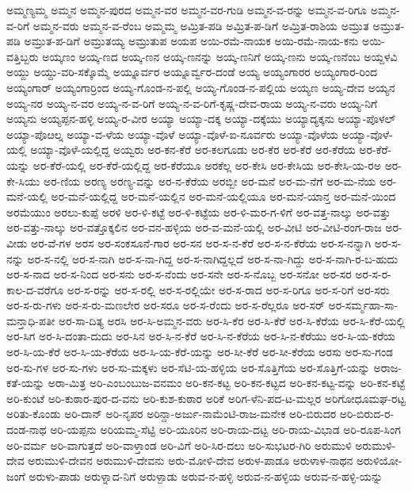 ಅಮ್ಮಣ್ಯಮ್ಮ
ಅಮ್ಮನ
ಅಮ್ಮನ-ಪುರದ
ಅಮ್ಮನ-ವರ
ಅಮ್ಮನ-ವರ-ಗುಡಿ
ಅಮ್ಮನ-ವ-ರನ್ನು
ಅಮ್ಮನ-ವ-ರಿಗೂ
ಅಮ್ಮನ-ವ-ರಿಗೆ
ಅಮ್ಮನ-ವರು
ಅಮ್ಮನ-ವ-ರೆಂಬ
ಅಮ್ಮಮ್ಮ
ಅಮ್ರಿತ-ಪಡಿ
ಅಮ್ರಿತ-ಪ-ಡಿಗೆ
ಅಮ್ರಿತ-ರಾಶಿಯ
ಅಮ್ರುತ
ಅಮ್ರುತ-ಪಡಿ
ಅಮ್ರುತ-ಪ-ಡಿಗೆ
ಅಮ್ರುತಯ್ಯ
ಅಮ್ರುತುಪ
ಅಯಪ
ಅಯಿ-ರಮೆ-ನಾಯಕ
ಅಯಿ-ರಮೆ-ನಾಯ-ಕನು
ಅಯಿ-ವತ್ತಿಬ್ಬರು
ಅಯ್ಕಣಂ
ಅಯ್ಕ-ಣದ
ಅಯ್ಕ-ಣನ
ಅಯ್ಕ-ಣನನ್ನು
ಅಯ್ಕ-ಣನಿಗೆ
ಅಯ್ಕ-ಣನು
ಅಯ್ಕ-ಣನೆಂಬ
ಅಯ್ದಳವಿ
ಅಯ್ದು
ಅಯ್ದು-ವರಿ-ಸಕ್ಕೊಮ್ಮೆ
ಅಯ್ನೂರ್ವರ
ಅಯ್ನೂರ್ವ್ವರ-ದಂಡೆ
ಅಯ್ಯ
ಅಯ್ಯಂಗಾರರ
ಅಯ್ಯಂಗಾರ-ರಿಂದ
ಅಯ್ಯಂಗಾರ್
ಅಯ್ಯಂಗಾರ್ರಿಂದ
ಅಯ್ಯ-ಗೊಂಡ-ನ-ಪಲ್ಲಿ
ಅಯ್ಯ-ಗೊಂಡ-ನ-ಪಲ್ಲಿಯ
ಅಯ್ಯಣ
ಅಯ್ಯ-ದೇವ
ಅಯ್ಯನ
ಅಯ್ಯ-ನರ
ಅಯ್ಯ-ನ-ವರ
ಅಯ್ಯ-ನ-ವ-ರಿಗೆ
ಅಯ್ಯ-ನ-ವ-ರಿಗೆ-ಕೃಷ್ಣ-ದೇವ-ರಾಯ
ಅಯ್ಯ-ನ-ವರು
ಅಯ್ಯ-ನಿಗೆ
ಅಯ್ಯನು
ಅಯ್ಯಪ್ಪನ-ಹಳ್ಳಿ
ಅಯ್ಯ-ರ-ವೀರ
ಅಯ್ಯಾ
ಅಯ್ಯಾ-ದಕ್ಕ
ಅಯ್ಯಾ-ದಕ್ಕೆಯು
ಅಯ್ಯಾದ್ಯಕ್ಕನು
ಅಯ್ಯಾ-ಪೊಳಲ್
ಅಯ್ಯಾ-ಪೊೞಲ್ನ
ಅಯ್ಯಾ-ವ-ಳೆಯ
ಅಯ್ಯಾ-ವೊಳೆ
ಅಯ್ಯಾ-ವೊಳೆ-ಐ-ನೂರ್ವರು
ಅಯ್ಯಾ-ವೊಳೆಯ
ಅಯ್ಯಾ-ವೊಳೆ-ಯಲ್ಲಿ
ಅಯ್ಯಾ-ವೊಳೆ-ಯಲ್ಲಿದ್ದ
ಅಯ್ವರು
ಅರ-ಕನ-ಕೆರೆ
ಅರ-ಕಲಗೂಡು
ಅರ-ಕೆರ
ಅರ-ಕೆರೆ
ಅರ-ಕೆರೆಯ
ಅರ-ಕೆರೆ-ಯನ್ನು
ಅರ-ಕೆರೆ-ಯಲ್ಲಿ
ಅರ-ಕೆರೆ-ಯಲ್ಲಿದ್ದ
ಅರ-ಕೆರೆಯೂ
ಅರಕೆಲ್ಲ
ಅರ-ಕೇಸಿ
ಅರ-ಕೇಸಿಯ
ಅರ-ಕೇಸಿ-ಯ-ರಅ
ಅರ-ಕೇ-ಸಿಯು
ಅರ-ಣಿಯ
ಅರಣ್ಯ
ಅರಣ್ಯ-ವನ್ನು
ಅರ-ನ-ಕೆರೆಯ
ಅರಬ್ಬೀ
ಅರ-ಮನೆ
ಅರ-ಮ-ನೆಗೆ
ಅರ-ಮ-ನೆಯ
ಅರ-ಮನೆ-ಯಲ್ಲಿ
ಅರ-ಮನೆ-ಯಲ್ಲಿದ್ದ
ಅರ-ಮನೆ-ಯಲ್ಲಿನ
ಅರ-ಮನೆ-ಯಲ್ಲಿಯೂ
ಅರ-ಮನೆ-ಯಾನ್ತ
ಅರ-ಮನೆ-ಯಿಂದ
ಅರಮೆಯುಂ
ಅರಲು-ಕುಪ್ಪೆ
ಅರಳಿ
ಅರ-ಳಿ-ಕಟ್ಟೆ
ಅರ-ಳಿ-ಕಟ್ಟೆಯ
ಅರ-ಳಿ-ಮರ-ಗ-ಳಿಗೆ
ಅರ-ವತ್ತ-ನಾಲ್ಕು
ಅರ-ವತ್ತು
ಅರ-ವತ್ತು-ನಾಲ್ಕು
ಅರ-ವತ್ತೊಕ್ಕಲಿನ
ಅರ-ವನ-ಹಳ್ಳಿಯ
ಅರ-ವ-ಮನೆ-ಯಲ್ಲಿ
ಅರ-ವೀಟಿ
ಅರ-ವೀಟಿ-ರಂಗ-ರಾಜ
ಅರ-ವೀಡು
ಅರ-ವೆ-ಗಳ
ಅರಸ
ಅರ-ಸಂಕಸೂನೆ-ಗಾರ
ಅರ-ಸನ
ಅರ-ಸ-ನ-ಕೆರೆ
ಅರ-ಸ-ನ-ಕೆರೆಯ
ಅರ-ಸ-ನನ್ನಾಗಿ
ಅರ-ಸ-ನನ್ನು
ಅರ-ಸ-ನಲ್ಲಿ
ಅರ-ಸ-ನಾಗಿ
ಅರ-ಸ-ನಾ-ಗಿದ್ದ
ಅರ-ಸ-ನಾಗಿದ್ದಲ್ಲದೆ
ಅರ-ಸ-ನಾ-ಗಿದ್ದು
ಅರ-ಸ-ನಾಗಿ-ರ-ಬ-ಹುದು
ಅರ-ಸ-ನಾದ
ಅರ-ಸ-ನಿಂದ
ಅರ-ಸನು
ಅರ-ಸ-ನೆಂದು
ಅರ-ಸನೇ
ಅರ-ಸ-ನೊಬ್ಬ
ಅರ-ಸನೋ
ಅರ-ಸರ
ಅರ-ಸ-ರ-ಕಾಲ-ದ-ವರೆಗೂ
ಅರ-ಸ-ರನ್ನು
ಅರ-ಸ-ರಲ್ಲಿ
ಅರ-ಸ-ರಲ್ಲಿಯೇ
ಅರ-ಸ-ರಾದ
ಅರ-ಸ-ರಿಗೂ
ಅರ-ಸ-ರಿಗೆ
ಅರ-ಸರು
ಅರ-ಸ-ರು-ಗಳು
ಅರ-ಸ-ರು-ಮಣಲೇರ
ಅರ-ಸರೂ
ಅರ-ಸ-ರೆಂದು
ಅರ-ಸ-ರೆಲ್ಲರೂ
ಅರ-ಸರ್
ಅರ-ಸರ್ಮ್ಮಹಾ-ಸಾ-ಮನ್ತಾಧಿ-ಪತೀ
ಅರ-ಸಾ-ದಿತ್ಯ
ಅರಸಿ
ಅರ-ಸಿ-ಅಮ್ಮನ-ವರು
ಅರ-ಸಿ-ಕೆರ
ಅರ-ಸಿ-ಕೆರೆ
ಅರ-ಸಿ-ಕೆರೆಯ
ಅರ-ಸಿ-ಕೆರೆ-ಯಲ್ಲಿ
ಅರ-ಸಿಗ
ಅರ-ಸಿ-ದಂತಾ-ದುದು
ಅರ-ಸಿನ
ಅರ-ಸಿ-ನ-ಕೆರೆ
ಅರ-ಸಿ-ನ-ಕೆರೆಯ
ಅರ-ಸಿ-ನ-ಕೆರೆಯು
ಅರ-ಸಿ-ಯ-ಕರೆಯ
ಅರ-ಸಿ-ಯ-ಕೆರೆ
ಅರ-ಸಿ-ಯ-ಕೆರೆಯ
ಅರ-ಸಿ-ಯ-ಕೆರೆ-ಯನ್ನು
ಅರ-ಸೀ-ಕೆರೆ
ಅರ-ಸೀ-ಕೆರೆಯ
ಅರಸು
ಅರ-ಸು-ಗಂಡ
ಅರ-ಸು-ಗಳ
ಅರ-ಸು-ಗಳು
ಅರ-ಸು-ಮಕ್ಕಳು
ಅರ-ಸೆಟಿ-ಯ-ಹಳ್ಳಿಯ
ಅರ-ಸೊತ್ತಿಗೆಯ
ಅರ-ಸೊತ್ತಿಗೆ-ಯನ್ನು
ಅರಾಜ-ಕತೆ-ಯನ್ನು
ಅರಾ-ಮಿತ್ರ
ಅರಿ-ಎಂಬಂಬುಜ-ವನಮಂ
ಅರಿ-ಕನ-ಕಟ್ಟ
ಅರಿ-ಕನ-ಕಟ್ಟದ
ಅರಿ-ಕನ-ಕಟ್ಟ-ವನ್ನು
ಅರಿ-ಕನ-ಕಟ್ಟೆ
ಅರಿ-ಕುಂಟೆ
ಅರಿ-ಕುಠಾರ-ಪುರ-ದ-ವನು
ಅರಿ-ಕುಶ-ಕುಠಾರ
ಅರಿಕೆ
ಅರಿಗ-ಳೆನಿ-ಪದ-ಟ-ಮಲ್ಲರ
ಅರಿಗೋಧೂಮಘ-ರಟ್ಟ
ಅರಿತು-ಕೊಂಡು
ಅರಿ-ದಾನ್
ಅರಿ-ನೃಪರ
ಅರಿನ್ದಾ-ಅರ್ಜು-ನಾಮೆಂಟಿ-ರಾಜ-ಮನೇಕ
ಅರಿ-ಬಿರುದರ
ಅರಿ-ಬಿರುದ-ರ-ದಂಡ-ನಾಥ
ಅರಿ-ಯಪ್ಪನು
ಅರಿಯಮ್ಮ-ಸೆಟ್ಟಿ
ಅರಿ-ಯೂರಿನ
ಅರಿ-ರಾಯ-ದಟ್ಟ
ಅರಿ-ರಾಯ-ವಿಭಾಡ
ಅರಿ-ರೂಪ-ಸಿಂಗ
ಅರಿ-ವರ್ಮ
ಅರಿ-ವಾಗುತ್ತದೆ
ಅರಿ-ವಾಳ್ತಾಂಡ
ಅರಿ-ವಿಗೆ
ಅರಿ-ಸಿರ-ದಲು
ಅರಿ-ಸುಭಟರ-ಗಿರಿ
ಅರುಮುಳಿ
ಅರುಮುಳಿ-ದೇವ
ಅರುಮುಳಿ-ದೇವನ
ಅರುಮುಳಿ-ದೇವನು
ಅರು-ಮೋಳಿ-ದೇವ
ಅರುಳ-ಪಾಡೂ
ಅರುಳಾಳ-ನಾಥನ
ಅರುಳಿಯೋ-ಜಂಗೆ
ಅರುಳು-ಪಾಡು
ಅರುಳ್ನಾದ-ನಿಗೆ
ಅರುಳ್ಪಾಡು
ಅರುವ-ನ-ಹಳ್ಳಿ
ಅರುವ-ನ-ಹಳ್ಳಿಯ
ಅರುವ-ನ-ಹಳ್ಳಿ-ಯನ್ನು
